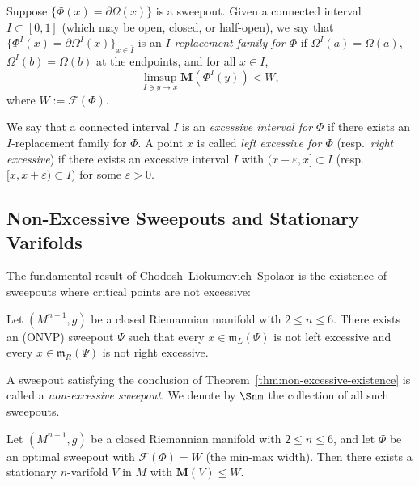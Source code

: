 \begin{definition}\label{def:excessive-interval}
Suppose $\{\Phi(x) = \partial\Omega(x)\}$ is a sweepout. Given a connected interval $I \subset [0,1]$
(which may be open, closed, or half-open), we say that $\{\Phi^I(x) = \partial\Omega^I(x)\}_{x\in \bar{I}}$
is an \emph{$I$-replacement family for $\Phi$} if
$\Omega^I(a) = \Omega(a)$, $\Omega^I(b) = \Omega(b)$ at the endpoints, and for all $x \in I$,
\[
\limsup_{I \ni y \to x} \mathbf{M}(\Phi^I(y)) < W,
\]
where $W := \mathcal{F}(\Phi)$.

We say that a connected interval $I$ is an \emph{excessive interval for $\Phi$} if there exists an $I$-replacement family
for $\Phi$. A point $x$ is called \emph{left excessive for $\Phi$} (resp.\ \emph{right excessive}) if there exists an excessive interval $I$ with
$(x-\varepsilon, x] \subset I$ (resp.\ $[x, x+\varepsilon) \subset I$) for some $\varepsilon > 0$.
\end{definition}

\subsection{Non-Excessive Sweepouts and Stationary Varifolds}\label{subsec:stationary-varifolds-non-excessive}

The fundamental result of Chodosh--Liokumovich--Spolaor is the existence of sweepouts where critical points are not excessive:

\begin{theorem}\label{thm:non-excessive-existence}
Let $(M^{n+1},g)$ be a closed Riemannian manifold with $2\leq n\leq 6$. There exists an (ONVP) sweepout $\Psi$ such that every $x\in \mathfrak{m}_L(\Psi)$ is not left excessive and every $x \in \mathfrak{m}_R(\Psi)$ is not right excessive.
\end{theorem}

A sweepout satisfying the conclusion of Theorem~\ref{thm:non-excessive-existence} is called a \emph{non-excessive sweepout}. We denote by $\Snm$ the collection of all such sweepouts.

\begin{proposition}\label{thm:CLS-stationary}
Let $(M^{n+1},g)$ be a closed Riemannian manifold with $2\leq n\leq 6$, and let $\Phi$ be an optimal sweepout with $\mathcal{F}(\Phi) = W$ (the min-max width). Then there exists a stationary $n$-varifold $V$ in $M$ with $\mathbf{M}(V) \leq W$.
\end{proposition}


